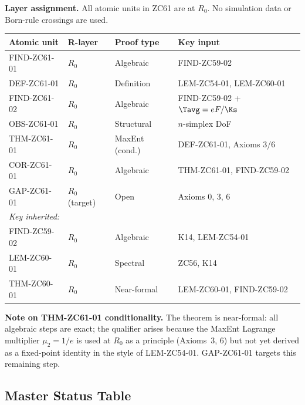 \documentclass[12pt, a4paper]{article}
\begin{document}
\begin{layerbox}[title={R-Layer Assignments for ZC61}]
\textbf{Layer assignment.}
All atomic units in ZC61 are at $R_0$.
No simulation data or Born-rule crossings are used.

\medskip
\begin{center}
{\small\renewcommand{\arraystretch}{1.25}
\begin{tabular}{@{}llll@{}}
\toprule
Atomic unit & R-layer & Proof type & Key input \\
\midrule
FIND-ZC61-01 & $R_0$ & Algebraic & FIND-ZC59-02 \\
DEF-ZC61-01  & $R_0$ & Definition & LEM-ZC54-01, LEM-ZC60-01 \\
FIND-ZC61-02 & $R_0$ & Algebraic & FIND-ZC59-02 + $\Tavg=eF/\Ks$ \\
OBS-ZC61-01  & $R_0$ & Structural & $n$-simplex DoF \\
THM-ZC61-01  & $R_0$ & MaxEnt (cond.) & DEF-ZC61-01, Axioms 3/6 \\
COR-ZC61-01  & $R_0$ & Algebraic & THM-ZC61-01, FIND-ZC59-02 \\
GAP-ZC61-01  & $R_0$ (target) & Open & Axioms 0, 3, 6 \\
\midrule
\multicolumn{4}{l}{\textit{Key inherited:}} \\
FIND-ZC59-02  & $R_0$ & Algebraic & K14, LEM-ZC54-01 \\
LEM-ZC60-01   & $R_0$ & Spectral & ZC56, K14 \\
THM-ZC60-01   & $R_0$ & Near-formal & LEM-ZC60-01, FIND-ZC59-02 \\
\bottomrule
\end{tabular}
}
\end{center}

\textbf{Note on THM-ZC61-01 conditionality.}
The theorem is near-formal: all algebraic steps are exact;
the qualifier arises because the MaxEnt Lagrange multiplier
$\mu_2 = 1/e$ is used at $R_0$ as a principle
(Axioms~3, 6) but not yet derived as a fixed-point
identity in the style of LEM-ZC54-01.
GAP-ZC61-01 targets this remaining step.
\end{layerbox}

\subsection{Master Status Table}
\label{sec:status}
\end{document}
